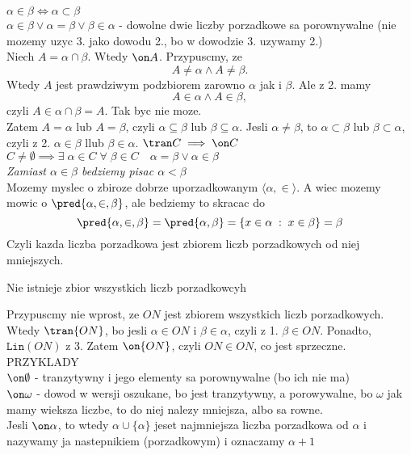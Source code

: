\documentclass{article}
\begin{document}
     $\alpha\in\beta\iff\alpha\subset\beta$\medskip\\
     $\alpha\in\beta\lor\alpha=\beta\lor\beta\in\alpha$ - {\color{acc}dowolne dwie liczby porzadkowe sa porownywalne} (nie mozemy uzyc 3. jako dowodu 2., bo w dowodzie 3. uzywamy 2.)\medskip\\
    Niech $A=\alpha\cap \beta$. Wtedy $\on A$. Przypuscmy, ze 
    $$A\neq\alpha\land A\neq\beta.$$ 
    Wtedy $A$ jest prawdziwym podzbiorem zarowno $\alpha$ jak i $\beta$. Ale z 2. mamy
    $$A\in\alpha\land A\in\beta,$$
    czyli $A\in\alpha\cap\beta=A$. Tak byc nie moze.\smallskip\\
    Zatem $A=\alpha$ lub $A=\beta$, czyli $\alpha\subseteq\beta$ lub $\beta\subseteq\alpha$. Jesli $\alpha\neq\beta$, to $\alpha\subset\beta$ lub $\beta\subset\alpha$, czyli z 2. $\alpha\in\beta$ llub $\beta\in\alpha$.\kondow    
     $\tran C\implies \on C$\medskip\\
     $C\neq \emptyset\implies \exists\;\alpha\in C\;\forall\;\beta\in C\quad \alpha=\beta\lor\alpha\in \beta$\bigskip\\
    \emph{\color{emp}Zamiast $\alpha\in\beta$ bedziemy pisac $\alpha<\beta$}\smallskip\\
    Mozemy myslec o zbiroze dobrze uporzadkowanym $\langle \alpha, \in\rangle$. A wiec mozemy mowic o $\pred{\alpha, \in, \beta}$, ale bedziemy to skracac do
    $$\pred{\alpha,\in,\beta}=\pred{\alpha,\beta}=\{x\in\alpha\;:\;x\in\beta\}=\beta$$
    Czyli kazda liczba porzadkowa jest zbiorem liczb porzadkowych od niej mniejszych.\bigskip\\
    \begin{center}
        {\large\color{def} Nie istnieje zbior wszystkich liczb porzadkowcyh}
    \end{center}\bigskip
    \dowod
    Przypuscmy nie wprost, ze $ON$ jest zbiorem wszystkich liczb porzadkowych. Wtedy $\tran {ON}$, bo jesli $\alpha\in ON$ i $\beta\in\alpha$, czyli z 1. $\beta\in ON$. Ponadto, $\texttt{Lin}(ON)$ z 3. Zatem $\on {ON}$, czyli $ON\in ON$, co jest sprzeczne.
    \kondow
    \bigskip\\
    {\large\color{emp}PRZYKLADY}\bigskip\\
    \indent $\on\emptyset$ - tranzytywny i jego elementy sa porownywalne (bo ich nie ma)\medskip\\
    \indent $\on\omega$ - dowod w wersji oszukane, bo jest tranzytywny, a porowywalne, bo $\omega$ jak mamy wieksza liczbe, to do niej nalezy mniejsza, albo sa rowne.\medskip\\
    \indent Jesli $\on\alpha$, to wtedy $\alpha\cup\{\alpha\}$ jeset najmniejsza liczba porzadkowa od $\alpha$ i nazywamy ja {\color{acc}nastepnikiem (porzadkowym)} i oznaczamy $\alpha+1$\medskip\\
\end{document}
